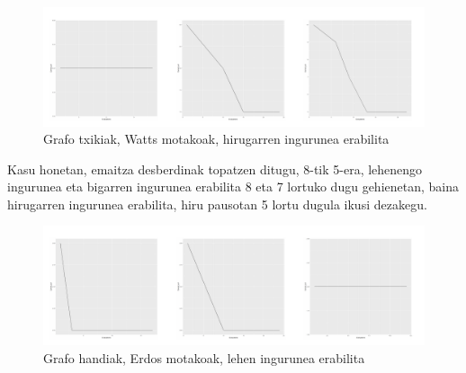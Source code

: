 \documentclass[eu,gi]{ifirak}\usepackage[]{graphicx}\usepackage[]{color}
\makeatletter
\def\maxwidth{ %
  \ifdim\Gin@nat@width>\linewidth
    \linewidth
  \else
    \Gin@nat@width
  \fi
}
\newenvironment{knitrout}{}{} %
\makeatother
\begin{document}
\begin{center}	
\begin{knitrout}
\color{fgcolor}\begin{figure}[!h]
\includegraphics[width=\maxwidth]{figure/unnamed-chunk-9-1} \caption[Grafo txikiak, Watts motakoak, hirugarren ingurunea erabilita]{Grafo txikiak, Watts motakoak, hirugarren ingurunea erabilita}\label{fig:unnamed-chunk-9}
\end{figure}


\end{knitrout}
\end{center}
\vspace*{0.1cm}
Kasu honetan, emaitza desberdinak topatzen ditugu, 8-tik 5-era, lehenengo ingurunea eta bigarren ingurunea erabilita 8 eta 7 lortuko dugu gehienetan, baina hirugarren ingurunea erabilita, hiru pausotan 5 lortu dugula ikusi dezakegu.\\

\begin{center}	
\begin{knitrout}
\color{fgcolor}\begin{figure}[!h]
\includegraphics[width=\maxwidth]{figure/unnamed-chunk-10-1} \caption[Grafo handiak, Erdos motakoak, lehen ingurunea erabilita]{Grafo handiak, Erdos motakoak, lehen ingurunea erabilita}\label{fig:unnamed-chunk-10}
\end{figure}


\end{knitrout}
\end{center}
\end{document}

